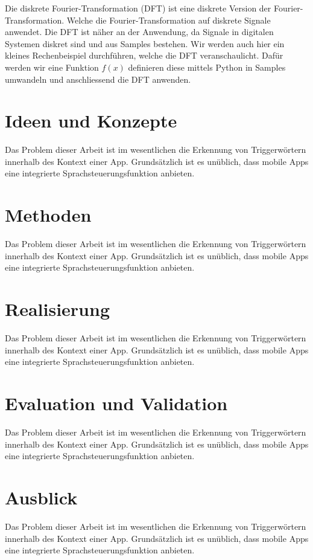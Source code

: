 \documentclass[11pt,a4paper]{article}
\begin{document}
Die diskrete Fourier-Transformation (DFT) ist eine diskrete Version der Fourier-Transformation.
Welche die Fourier-Transformation auf diskrete Signale anwendet. Die DFT ist näher an der
Anwendung, da Signale in digitalen Systemen diskret sind und aus Samples bestehen. Wir werden auch 
hier ein kleines Rechenbeispiel durchführen, welche die DFT veranschaulicht. Dafür werden wir eine
Funktion \( f(x) \) definieren diese mittels Python in Samples umwandeln und anschliessend die DFT
anwenden.












\newpage
\section{Ideen und Konzepte}
Das Problem dieser Arbeit ist im wesentlichen die Erkennung von Triggerwörtern innerhalb
des Kontext einer App. Grundsätzlich ist es unüblich, dass mobile Apps eine
integrierte Sprachsteuerungsfunktion anbieten.


\newpage
\section{Methoden}
Das Problem dieser Arbeit ist im wesentlichen die Erkennung von Triggerwörtern innerhalb
des Kontext einer App. Grundsätzlich ist es unüblich, dass mobile Apps eine
integrierte Sprachsteuerungsfunktion anbieten.


\newpage
\section{Realisierung}
Das Problem dieser Arbeit ist im wesentlichen die Erkennung von Triggerwörtern innerhalb
des Kontext einer App. Grundsätzlich ist es unüblich, dass mobile Apps eine
integrierte Sprachsteuerungsfunktion anbieten.


\newpage
\section{Evaluation und Validation}
Das Problem dieser Arbeit ist im wesentlichen die Erkennung von Triggerwörtern innerhalb
des Kontext einer App. Grundsätzlich ist es unüblich, dass mobile Apps eine
integrierte Sprachsteuerungsfunktion anbieten.

\newpage
\section{Ausblick}
Das Problem dieser Arbeit ist im wesentlichen die Erkennung von Triggerwörtern innerhalb
des Kontext einer App. Grundsätzlich ist es unüblich, dass mobile Apps eine
integrierte Sprachsteuerungsfunktion anbieten.
\end{document}
